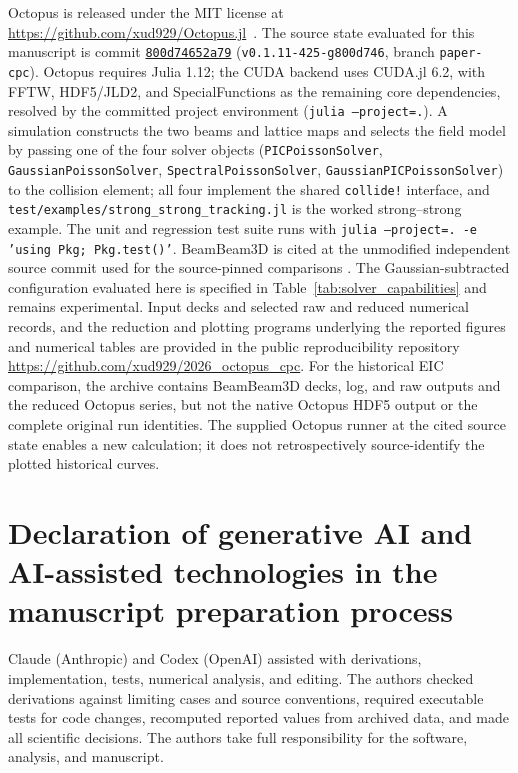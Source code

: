 \documentclass[a4paper,fleqn]{cas-sc}
\newcommand{\code}[1]{\texttt{#1}}
\begin{document}
Octopus is released under the MIT license at
\url{https://github.com/xud929/Octopus.jl}~\citep{OctopusSoftware2026}.  The
source state evaluated for this manuscript is commit
\href{https://github.com/xud929/Octopus.jl/commit/800d74652a79c59fca89e0d612703ddda5fd47b7}
{\code{800d74652a79}}
(\code{v0.1.11-425-g800d746}, branch \code{paper-cpc}).
Octopus requires Julia 1.12; the CUDA backend uses CUDA.jl 6.2, with FFTW,
HDF5/JLD2, and SpecialFunctions as the remaining core dependencies, resolved
by the committed project environment (\code{julia --project=.}).  A
simulation constructs the two beams and lattice maps and selects the field
model by passing one of the four solver objects
(\code{PICPoissonSolver}, \code{GaussianPoissonSolver},
\code{SpectralPoissonSolver}, \code{GaussianPICPoissonSolver}) to the
collision element; all four implement the shared \code{collide!} interface,
and \code{test/examples/strong\_strong\_tracking.jl} is the worked
strong--strong example.  The unit and regression test suite runs with
\code{julia --project=. -e 'using Pkg; Pkg.test()'}.  BeamBeam3D is cited at the unmodified independent
source commit used for the source-pinned comparisons
\citep{BeamBeam3DSoftware2024}.  The
Gaussian-subtracted configuration evaluated here is specified in
Table~\ref{tab:solver_capabilities} and remains experimental.  Input decks and
selected raw and reduced numerical records, and the reduction and plotting
programs underlying the reported figures and numerical tables are provided in
the public reproducibility repository
\url{https://github.com/xud929/2026_octopus_cpc}.  For the historical EIC comparison,
the archive contains BeamBeam3D decks, log, and raw outputs and the reduced
Octopus series, but not the native Octopus HDF5 output or the complete original
run identities.  The supplied Octopus runner at the cited source state enables
a new calculation; it does not retrospectively source-identify the plotted
historical curves.

\section*{Declaration of generative AI and AI-assisted technologies in the manuscript preparation process}

Claude (Anthropic) and Codex (OpenAI) assisted with derivations,
implementation, tests, numerical analysis, and editing.  The authors checked
derivations against limiting cases and source conventions, required executable
tests for code changes, recomputed reported values from archived data, and made
all scientific decisions.  The authors take full responsibility for the
software, analysis, and manuscript.
\end{document}

